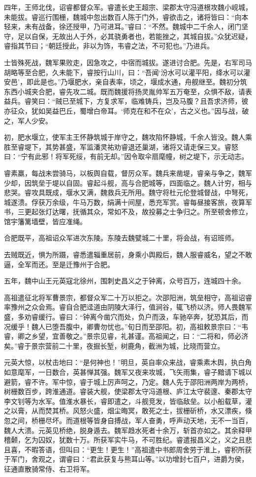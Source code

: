 \documentclass[12pt,UTF8]{ctexbook}
\begin{document}
四年，王师北伐，诏睿都督众军。睿遣长史王超宗、梁郡太守冯道根攻魏小岘城，未能拔。睿巡行围栅，魏城中忽出数百人陈于门外，睿欲击之，诸将皆曰：“向本轻来，未有战备，徐还授甲，乃可进耳。”睿曰：“不然。魏城中二千余人，闭门坚守，足以自保，无故出人于外，必其骁勇者也，若能挫之，其城自拔。”众犹迟疑，睿指其节曰；“朝廷授此，非以为饰，韦睿之法，不可犯也。”乃进兵。

士皆殊死战，魏军果败走，因急攻之，中宿而城拔。遂进讨合肥。先是，右军司马胡略等至合肥，久未能下，睿按行山川，曰：“吾闻‘汾水可以灌平阳，绛水可以灌安邑’，即此是也。”乃堰肥水，亲自表率，顷之，堰成水通，舟舰继至。魏初分筑东西小城夹合肥，睿先攻二城。既而魏援将扬灵胤帅军五万奄至，众惧不敌，请表益兵。睿笑曰：“贼已至城下，方复求军，临难铸兵，岂及马腹？且吾求济师，彼亦征众，犹如吴益巴丘，蜀增白帝耳。‘师克在和不在众’，古之义也。”因与战，破之，军人少安。

初，肥水堰立，使军主王怀静筑城于岸守之，魏攻陷怀静城，千余人皆没。魏人乘胜至睿堤下，其势甚盛，军监潘灵祐劝睿退还巢湖，诸将又请走保三叉。睿怒曰：“宁有此邪！将军死绥，有前无却。”因令取伞扇麾幢，树之堤下，示无动志。

睿素羸，每战未尝骑马，以板舆自载，督厉众军。魏兵来凿堤，睿亲与争之，魏军少却，因筑垒于堤以自固。睿起斗舰，高与合肥城等，四面临之。魏人计穷，相与悲哭。睿攻具既成，堰水又满，魏救兵无所用。魏守将杜元伦登城督战，中弩死，城遂溃。俘获万余级，牛马万数，绢满十间屋，悉充军赏。睿每昼接客旅，夜算军书，三更起张灯达曙，抚循其众，常如不及，故投募之士争归之。所至顿舍修立，馆宇籓篱墙壁，皆应准绳。

合肥既平，高祖诏众军进次东陵。东陵去魏甓城二十里，将会战，有诏班师。

去贼既近，惧为所蹑，睿悉遣辎重居前，身乘小舆殿后，魏人服睿威名，望之不敢逼，全军而还。至是迁豫州于合肥。

五年，魏中山王元英寇北徐州，围刺史昌义之于钟离，众号百万，连城四十余。

高祖遣征北将军曹景宗，都督众军二十万以拒之。次邵阳洲，筑垒相守，高祖诏睿率豫州之众会焉。睿自合肥迳道由阴陵大泽行，值涧谷，辄飞桥以济。师人畏魏军盛，多劝睿缓行。睿曰：“钟离今凿穴而处，负户而汲，车驰卒奔，犹恐其后，而况缓乎！魏人已堕吾腹中，卿曹勿忧也。”旬日而至邵阳。初，高祖敕景宗曰：“韦睿，卿之乡望，宜善敬之。”景宗见睿，礼甚谨。高祖闻之，曰：“二将和，师必济矣。”睿于景宗营前二十里，夜掘长堑，树鹿角，截洲为城，比晓而营立。

元英大惊，以杖击地曰：“是何神也！”明旦，英自率众来战，睿乘素木舆，执白角如意麾军，一日数合，英甚惮其强。魏军又夜来攻城，飞矢雨集，睿子黯请下城以避箭，睿不许。军中惊，睿于城上厉声呵之，乃定。魏人先于邵阳洲两岸为两桥，树栅数百步，跨淮通道。睿装大舰，使梁郡太守冯道根、庐江太守裴邃、秦郡太守李文钊等为水军。值淮水暴长，睿即遣之，斗舰竞发，皆临敌垒。以小船载草，灌之以膏，从而焚其桥。风怒火盛，烟尘晦冥，敢死之士，拔栅斫桥，水又漂疾，倏忽之间，桥栅尽坏。而道根等皆身自搏战，军人奋勇，呼声动天地，无不一当百，魏人大溃。元英见桥绝，脱身遁去。魏军趋水死者十余万，斩首亦如之。其余释甲稽颡，乞为囚奴，犹数十万。所获军实牛马，不可胜纪。睿遣报昌义之，义之且悲且喜，不暇答语，但叫曰：“更生！更生！”高祖遣中书郎周舍劳于淮上，睿积所获于军门，舍观之，谓睿曰：“君此获复与熊耳山等。”以功增封七百户，进爵为侯，征通直散骑常侍、右卫将军。
\end{document}
